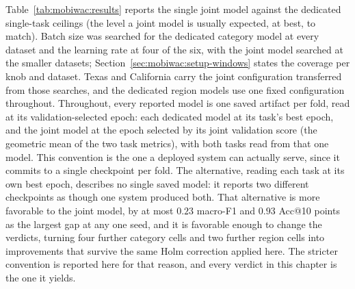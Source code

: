 Table~\ref{tab:mobiwac:results} reports the single joint model against the dedicated
single-task ceilings (the level a joint model is usually expected, at
best, to match). Batch size was searched for the dedicated category model at every dataset and the learning rate at
four of the six, with the joint model searched at the smaller datasets;
Section~\ref{sec:mobiwac:setup-windows} states the coverage per knob and dataset. Texas and California carry
the joint configuration transferred from those searches, and the dedicated region models use one
fixed configuration throughout.
Throughout, every reported model is one saved artifact per fold, read at its
validation-selected epoch: each dedicated model at its task's best epoch, and
the joint model at the epoch selected by its joint validation score (the
geometric mean of the two task metrics), with both tasks read from that one
model. This convention is the one a deployed system can actually serve, since it commits to a
single checkpoint per fold. The alternative, reading each task at its own best epoch, describes no
single saved model: it reports two different checkpoints as though one system produced both. That
alternative is more favorable to the joint model, by at most $0.23$ macro-F1 and $0.93$ Acc@10
points as the largest gap at any one seed, and it is favorable enough to change the verdicts,
turning four further category cells and two further region cells into improvements that survive the
same Holm correction applied here. The stricter convention is reported here for
that reason, and every verdict in this chapter is the one it yields.

